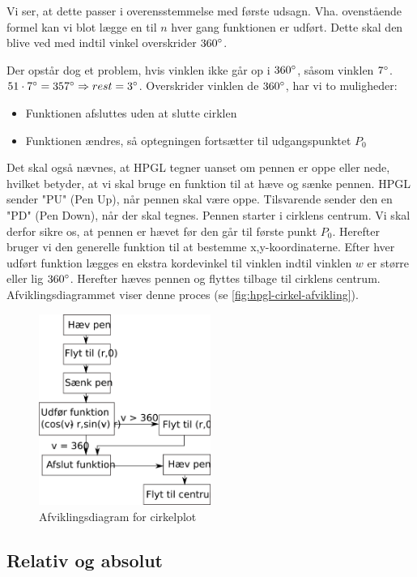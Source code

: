 Vi ser, at dette passer i overensstemmelse med første udsagn. Vha. ovenstående formel kan vi blot lægge en til $n$ hver gang funktionen er udført. Dette skal den blive ved med indtil vinkel overskrider $360^\circ$.


Der opstår dog et problem, hvis vinklen ikke går op i $360^\circ$, såsom vinklen $7^\circ$. $51\cdot 7^\circ = 357^\circ \Rightarrow rest = 3^\circ$. Overskrider vinklen de $360^\circ$, har vi to muligheder:
\begin{itemize} \firmlist
\item Funktionen afsluttes uden at slutte cirklen
\item Funktionen ændres, så optegningen fortsætter til udgangspunktet $P_0$
\end{itemize}
Det skal også nævnes, at HPGL tegner uanset om pennen er oppe eller nede, hvilket betyder, at vi skal bruge en funktion til at hæve og sænke pennen. HPGL sender "PU" (Pen Up), når pennen skal være oppe. Tilsvarende sender den en "PD" (Pen Down), når der skal tegnes. Pennen starter i cirklens centrum. Vi skal derfor sikre os, at pennen er hævet før den går til første punkt $P_0$. Herefter bruger vi den generelle funktion til at bestemme x,y-koordinaterne. Efter hver udført funktion lægges en ekstra kordevinkel til vinklen indtil vinklen $w$ er større eller lig $360^\circ$. Herefter hæves pennen og flyttes tilbage til cirklens centrum. Afviklingsdiagrammet viser denne proces (se \vref{fig:hpgl-cirkel-afvikling}).

\begin{figure}[htbp]
  \centering
  \includegraphics[width=0.5\textwidth]{./img/afviklingsdiagram-cirkel}
  \caption{Afviklingsdiagram for cirkelplot}
  \label{fig:hpgl-cirkel-afvikling}
\end{figure}

\subsection{Relativ og absolut}

